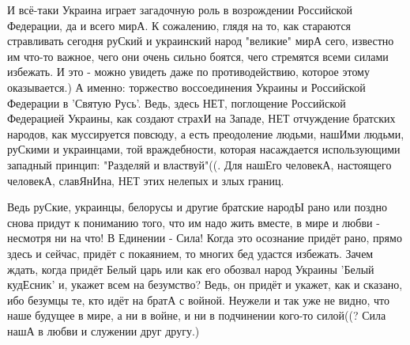 И всё-таки Украина играет загадочную роль в возрождении Российской Федерации,
да и всего мирА. К сожалению, глядя на то, как стараются стравливать сегодня
руСкий и украинский народ "великие" мирА сего, известно им что-то важное, чего
они очень сильно боятся, чего стремятся всеми силами избежать. И это - можно
увидеть даже по противодействию, которое этому оказывается.) А именно:
торжество воссоединения Украины и Российской Федерации в 'Святую Русь'. Ведь,
здесь НЕТ, поглощение Российской Федерацией Украины, как создают страхИ на
Западе, НЕТ отчуждение братских народов, как муссируется повсюду, а есть
преодоление людьми, нашИми людьми, руСкими и украинцами, той враждебности,
которая насаждается использующими западный принцип: "Разделяй и властвуй"((.
Для нашЕго человекА, настоящего человекА, славЯнИна, НЕТ этих нелепых и злых
границ.

Ведь руСкие, украинцы, белорусы и другие братские народЫ рано или поздно снова
придут к пониманию того, что им надо жить вместе, в мире и любви - несмотря ни
на что! В Единении - Сила! Когда это осознание придёт рано, прямо здесь и
сейчас, придёт с покаянием, то многих бед удастся избежать. Зачем ждать, когда
придёт Белый царь или как его обозвал народ Украины 'Белый кудЕсник' и, укажет
всем на безумство? Ведь, он придёт и укажет, как и сказано, ибо безумцы те, кто
идёт на братА с войной. Неужели и так уже не видно, что наше будущее в мире, а
ни в войне, и ни в подчинении кого-то силой((? Сила нашА в любви и служении
друг другу.)
